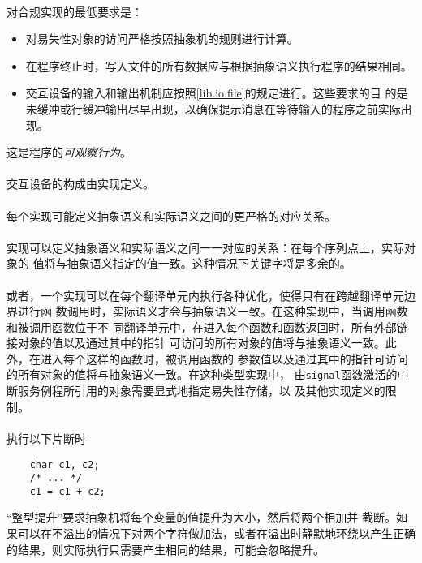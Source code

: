 \paragraph{}
对合规实现的最低要求是：
\begin{itemize}
  \item{对易失性对象的访问严格按照抽象机的规则进行计算。}
  \item{在程序终止时，写入文件的所有数据应与根据抽象语义执行程序的结果相同。}
  \item{交互设备的输入和输出机制应按照\ref{lib.io.file}的规定进行。这些要求的目
  的是未缓冲或行缓冲输出尽早出现，以确保提示消息在等待输入的程序之前实际出现。}
\end{itemize}
这是程序的\textit{可观察行为}。

\paragraph{}
交互设备的构成由实现定义。

\paragraph{}
每个实现可能定义抽象语义和实际语义之间的更严格的对应关系。

\paragraph{}
\ex 实现可以定义抽象语义和实际语义之间一一对应的关系：在每个序列点上，实际对象的
值将与抽象语义指定的值一致。这种情况下关键字将是多余的。

\paragraph{}
或者，一个实现可以在每个翻译单元内执行各种优化，使得只有在跨越翻译单元边界进行函
数调用时，实际语义才会与抽象语义一致。在这种实现中，当调用函数和被调用函数位于不
同翻译单元中，在进入每个函数和函数返回时，所有外部链接对象的值以及通过其中的指针
可访问的所有对象的值将与抽象语义一致。此外，在进入每个这样的函数时，被调用函数的
参数值以及通过其中的指针可访问的所有对象的值将与抽象语义一致。在这种类型实现中，
由\texttt{signal}函数激活的中断服务例程所引用的对象需要显式地指定易失性存储，以
及其他实现定义的限制。

\paragraph{}
\ex 执行以下片断时
\begin{lstlisting}
    char c1, c2;
    /* ... */
    c1 = c1 + c2;
\end{lstlisting}
``整型提升''要求抽象机将每个变量的值提升为大小，然后将两个相加并
截断。如果可以在不溢出的情况下对两个字符做加法，或者在溢出时静默地环绕以产生正确
的结果，则实际执行只需要产生相同的结果，可能会忽略提升。

